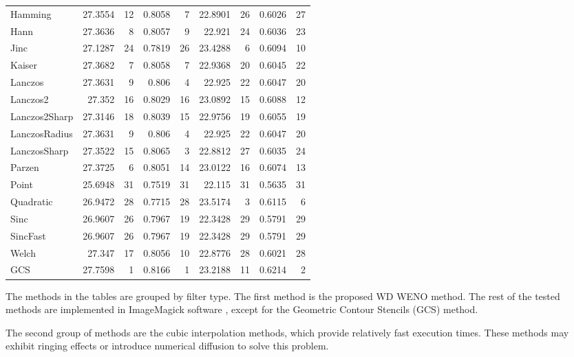 \begin{table}
\begin{center}
\begin{tabular}{lrrrr|rrrr}
				Hamming &  27.3554  &  12  &  0.8058  &  7  &  22.8901  &  26  &  0.6026  &  27 \\
				Hann &  27.3636  &  8  &  0.8057  &  9  &  22.921  &  24  &  0.6036  &  23 \\
				Jinc &  27.1287  &  24  &  0.7819  &  26  &  23.4288  &  6  &  0.6094  &  10 \\
				Kaiser &  27.3682  &  7  &  0.8058  &  7  &  22.9368  &  20  &  0.6045  &  22 \\
				Lanczos &  27.3631  &  9  &  0.806  &  4  &  22.925  &  22  &  0.6047  &  20 \\
				Lanczos2 &  27.352  &  16  &  0.8029  &  16  &  23.0892  &  15  &  0.6088  &  12 \\
				Lanczos2Sharp &  27.3146  &  18  &  0.8039  &  15  &  22.9756  &  19  &  0.6055  &  19 \\
				LanczosRadius &  27.3631  &  9  &  0.806  &  4  &  22.925  &  22  &  0.6047  &  20 \\
				LanczosSharp &  27.3522  &  15  &  0.8065  &  3  &  22.8812  &  27  &  0.6035  &  24 \\
				Parzen &  27.3725  &  6  &  0.8051  &  14  &  23.0122  &  16  &  0.6074  &  13 \\
				Point &  25.6948  &  31  &  0.7519  &  31  &  22.115  &  31  &  0.5635  &  31 \\
				Quadratic &  26.9472  &  28  &  0.7715  &  28  &  23.5174  &  3  &  0.6115  &  6 \\
				Sinc &  26.9607  &  26  &  0.7967  &  19  &  22.3428  &  29  &  0.5791  &  29 \\
				SincFast &  26.9607  &  26  &  0.7967  &  19  &  22.3428  &  29  &  0.5791  &  29 \\
				Welch &  27.347  &  17  &  0.8056  &  10  &  22.8776  &  28  &  0.6021  &  28 \\
				\hline
				GCS &  27.7598  &  1  &  0.8166  &  1  &  23.2188  &  11  &  0.6214  &  2 \\
				\hline
			\end{tabular}
		\end{center}
	\end{table}
	
The methods in the tables are grouped by filter type.
The first method is the proposed {WD} WENO method.
The rest of the tested methods are implemented in ImageMagick software \cite{imagemagick-web-2018}, except for the Geometric Contour Stencils (GCS) \cite{getreuergeomcontstenc} method.

The second group of methods are the cubic interpolation methods, which provide relatively fast execution times. These methods may exhibit ringing effects or introduce numerical diffusion to solve this problem.

